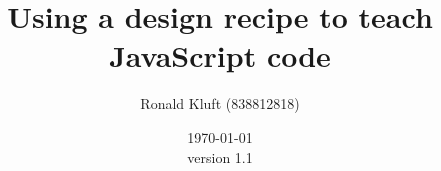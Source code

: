 \documentclass{article}
\begin{document}
 

\title{Using a design recipe to teach JavaScript code}
\author{Ronald Kluft (838812818)} 
\date{\today \\version 1.1} \maketitle 







\printglossaries
\end{document}
